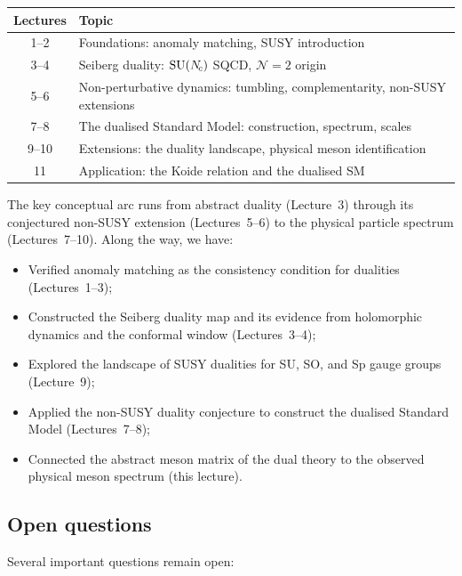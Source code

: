 \documentclass[11pt,a4paper]{article}
\begin{document}
\begin{center}
\renewcommand{\arraystretch}{1.3}
\begin{tabular}{cl}
\toprule
\textbf{Lectures} & \textbf{Topic} \\
\midrule
1--2 & Foundations: anomaly matching, SUSY introduction \\
3--4 & Seiberg duality: $\mathrm{SU}(N_{\!c})$ SQCD, $\mathcal{N} = 2$ origin \\
5--6 & Non-perturbative dynamics: tumbling, complementarity,
  non-SUSY extensions \\
7--8 & The dualised Standard Model: construction, spectrum, scales \\
9--10 & Extensions: the duality landscape, physical meson identification \\
11 & Application: the Koide relation and the dualised SM \\
\bottomrule
\end{tabular}
\end{center}

The key conceptual arc runs from abstract duality (Lecture~3) through
its conjectured non-SUSY extension (Lectures~5--6) to the physical
particle spectrum (Lectures~7--10).  Along the way, we have:
\begin{itemize}
  \item Verified anomaly matching as the consistency condition for
    dualities (Lectures~1--3);
  \item Constructed the Seiberg duality map and its evidence from
    holomorphic dynamics and the conformal window (Lectures~3--4);
  \item Explored the landscape of SUSY dualities for SU, SO, and Sp
    gauge groups (Lecture~9);
  \item Applied the non-SUSY duality conjecture to construct the
    dualised Standard Model (Lectures~7--8);
  \item Connected the abstract meson matrix of the dual theory to the
    observed physical meson spectrum (this lecture).
\end{itemize}


\subsection{Open questions}

Several important questions remain open:
\end{document}
